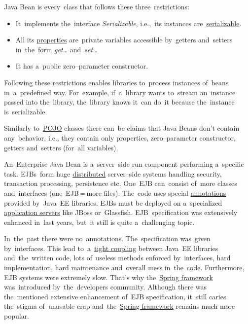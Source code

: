 \label{javabeans}
Java Bean is every~class that follows these three~restrictions:
\begin{itemize}
    \item It~implements the~interface \textit{Serializable}, i.e.,~its instances are~\hyperref[serialization]{serializable}.
    \item All its \hyperref[variablefieldproperty]{properties} are~private variables accessible by~getters and~setters in~the~form \textit{get\dots} and~\textit{set\dots}
    \item It has a~public zero--parameter constructor.
\end{itemize}
\noindent Following these restrictions enables libraries to~process instances of~beans in~a~predefined way.
For~example, if~a~library wants to~stream an~instance passed into the~library, the~library knows it~can do~it because the~instance is~serializable.

\warning Similarly to~\hyperref[pojo]{POJO} classes there can~be claims that Java Beans don't contain any~behavior, i.e., they contain only properties, zero--parameter constructor, getters and~setters (for~all variables).

\label{ejb}
An~Enterprise Java Bean is a~server--side run component performing a~specific task.
EJBs~form huge \hyperref[distributedsystem]{distributed} server--side systems handling security, transaction processing, persistence etc.
One~EJB can~consist of~more classes and~interfaces (one~EJB\,=\,more files).
The~code uses special \hyperref[annotations]{annotations} provided by~Java~EE libraries.
EJBs must be deployed on a~specialized \hyperref[applicationserver]{application servers} like JBoss or~Glassfish.
EJB~specification was extensively enhanced in~last years, but~it still is quite a~challenging topic.

In~the~past there were no~annotations.
The~specification was~given by~interfaces.
This lead to~a~\hyperref[loosetightcoupling]{tight coupling} between Java~EE libraries and~the~written code, lots of~useless methods enforced by~interfaces, hard implementation, hard maintenance and~overall mess in~the~code.
Furthermore, EJB systems were extremely slow.
That's why the~\hyperref[springframework]{Spring framework} was~introduced by~the~developers community.
Although there was the~mentioned extensive enhancement of~EJB specification, it~still caries the~stigma of~unusable crap and~the~\hyperref[springframework]{Spring framework} remains much more popular.

